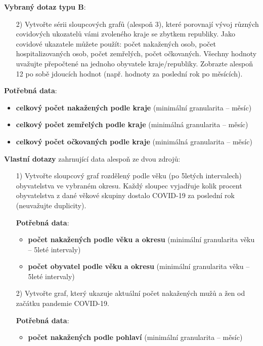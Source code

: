 \documentclass[12pt]{article}
\begin{document}
\hspace{1cm}

\textbf{Vybraný dotaz typu B}:
\begin{itemize}
    \item[2)] Vytvořte sérii sloupcových grafů (alespoň 3), které porovnají vývoj různých covidových ukozatelů vámi zvoleného kraje se zbytkem republiky. Jako covidové ukazatele můžete použít: počet nakažených osob, počet hospitalizovaných osob, počet zemřelých, počet očkovaných. Všechny hodnoty uvažujte přepočtené na jednoho obyvatele kraje/republiky. Zobrazte alespoň 12 po sobě jdoucích hodnot (např. hodnoty za poslední rok po měsících).
\end{itemize}

    \item[] \textbf{Potřebná data}:
    \begin{itemize}
        \item \textbf{celkový počet nakažených podle kraje} (minimální granularita -- měsíc)
        \item \textbf{celkový počet zemřelých podle kraje} (minimálná granularita -- měsíc)
        \item \textbf{celkový počet očkovaných podle kraje} (minimálná granularita -- měsíc)
    \end{itemize}

\hspace{1cm}

\textbf{Vlastní dotazy} zahrnující data alespoň ze dvou zdrojů:
\begin{itemize}
    \item[1)] Vytvořte sloupcový graf rozdělený podle věku (po 5letých intervalech) obyvatelstva ve vybraném okresu. Každý sloupec vyjadřuje kolik procent obyvatelstva z dané věkové skupiny dostalo COVID-19 za poslední rok (neuvažujte duplicity).
    
    \item[] \textbf{Potřebná data}:
    \begin{itemize}
        \item \textbf{počet nakažených podle věku a okresu} (minimální granularita věku -- 5leté intervaly)
        \item \textbf{počet obyvatel podle věku a okresu} (minimální granularita věku -- 5leté intervaly)
    \end{itemize}
    
    \item[2)] Vytvořte graf, který ukazuje aktuální počet nakažených mužů a žen od začátku pandemie COVID-19.
    
    \item[] \textbf{Potřebná data}:
    \begin{itemize}
        \item \textbf{počet nakažených podle pohlaví } (minimální granularita -- měsíc)
    \end{itemize}
\end{itemize}
\end{document}
